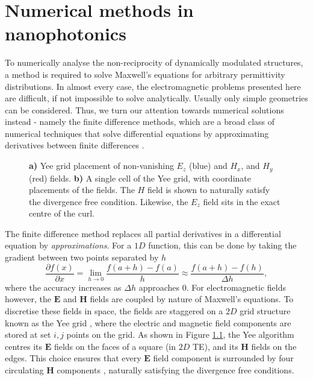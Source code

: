 \chapter{Numerical methods in nanophotonics}

\label{chapter:method}
To numerically analyse the non-reciprocity of dynamically modulated structures, a method is required to solve Maxwell's equations for arbitrary permittivity distributions. In almost every case, the electromagnetic problems presented here are difficult, if not impossible to solve analytically. Usually only simple geometries can be considered. Thus, we turn our attention towards numerical solutions instead - namely the finite difference methods, which are a broad class of numerical techniques that solve differential equations by approximating derivatives between finite differences \cite{Champagne2001}.


\begin{figure}[t]
	\centering
	\begin{subfigure}{0.5\textwidth}
		\centering
		
		\subcaption{}
		\label{sfig:yeegrid}
	\end{subfigure}%
	\begin{subfigure}{0.5\textwidth}
		\centering
		
		\subcaption{}
		\label{sfig:yeecell}
	\end{subfigure}
	\caption[Electromagnetic field distribution on the Yee grid]{\textbf{a)} Yee grid placement of non-vanishing $E_z$ (blue) and $H_x$, and $H_y$ (red) fields. \textbf{b)} A single cell of the Yee grid, with coordinate placements of the fields. The $H$ field is shown to naturally satisfy the divergence free condition. Likewise, the $E_z$ field sits in the exact centre of the curl.}
	\label{fig:yeegrid}
\end{figure}

The finite difference method replaces all partial derivatives in a differential equation by \textit{approximations}. For a $1D$ function, this can be done by taking the gradient between two points separated by $h$
\begin{equation}
\dfrac{\partial f(x)}{\partial x} = \lim\limits_{h \rightarrow 0} \dfrac{f(a+h) - f(a)}{h} \approx \dfrac{f(a+h)-f(h)}{\Delta h},
\end{equation}
where the accuracy increases as $\Delta h$ approaches 0. For electromagnetic fields however, the $\bm{E}$ and $\bm{H}$ fields are coupled by nature of Maxwell's equations. To discretise these fields in space, the fields are staggered on a $2D$ grid structure known as the Yee grid \cite{Yee1966}, where the electric and magnetic field components are stored at set $i,j$ points on the grid. As shown in Figure \ref{sfig:yeegrid}, the Yee algorithm centres its $\bm{E}$ fields on the faces of a square (in $2D$ TE), and its $\bm{H}$ fields on the edges. This choice ensures that every $\bm{E}$ field component is surrounded by four circulating $\bm{H}$ components \cite{Taflove2005}, naturally satisfying the divergence free conditions.

